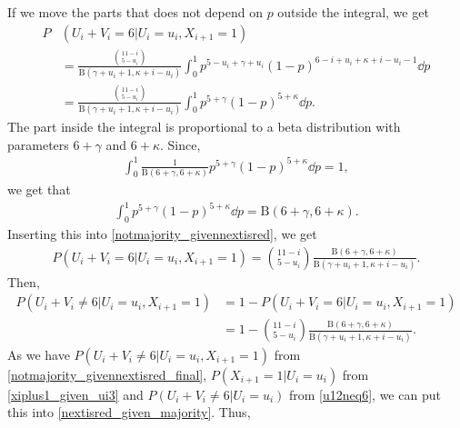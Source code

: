 If we move the parts that does not depend on $p$ outside the integral, we get
\begin{equation}
\label{notmajority_givennextisred}
    \begin{aligned}
        P&(U_i+V_i=6|U_i=u_i,X_{i+1}=1) \\[6pt]
        &= \frac{\binom{11-i}{5-u_i}}{\text{B}(\gamma+u_i+1,\kappa+i-u_i)}
        \int_0^1 p^{5-u_i+\gamma+u_i}(1-p)^{6-i+u_i+\kappa+i-u_i-1} \dd p\\[6pt]
        &= \frac{\binom{11-i}{5-u_i}}{\text{B}(\gamma+u_i+1,\kappa+i-u_i)}
        \int_0^1 p^{5+\gamma}(1-p)^{5+\kappa} \dd p.
    \end{aligned}
\end{equation}
The part inside the integral is proportional to a beta distribution with parameters $6+\gamma$ and $6+\kappa$. Since,
\begin{equation*}
    \begin{aligned}
        \int_0^1 \frac{1}{\text{B}(6+\gamma,6+\kappa)}
        p^{5+\gamma}(1-p)^{5+\kappa} \dd p 
        = 1,
    \end{aligned}
\end{equation*}
we get that
\begin{equation*}
    \begin{aligned}
        \int_0^1 p^{5+\gamma}(1-p)^{5+\kappa} \dd p 
        =\text{B}(6+\gamma,6+\kappa).
    \end{aligned}
\end{equation*}
Inserting this into \eqref{notmajority_givennextisred}, we get
\begin{equation*}
    \begin{aligned}
        P(U_i+V_i=6|U_i=u_i,X_{i+1}=1)
        = \binom{11-i}{5-u_i}\frac{\text{B}(6+\gamma,6+\kappa)}{\text{B}(\gamma+u_i+1,\kappa+i-u_i)}.
    \end{aligned}
\end{equation*}
Then, 
\begin{equation}
\label{notmajority_givennextisred_final}
    \begin{aligned}
        P(U_i+V_i\neq6|U_i=u_i,X_{i+1}=1)
        &=1-P(U_i+V_i=6|U_i=u_i,X_{i+1}=1)\\[6pt]
        &=1 - \binom{11-i}{5-u_i}\frac{\text{B}(6+\gamma,6+\kappa)}{\text{B}(\gamma+u_i+1,\kappa+i-u_i)}.
    \end{aligned}
\end{equation}
As we have $P(U_i+V_i\neq6|U_i=u_i,X_{i+1}=1)$ from \eqref{notmajority_givennextisred_final}, $P(X_{i+1}=1|U_i=u_i)$ from \eqref{xiplus1_given_ui3} and $P(U_i+V_i\neq6|U_i=u_i)$ from \eqref{u12neq6}, we can put this into \eqref{nextisred_given_majority}. Thus,
